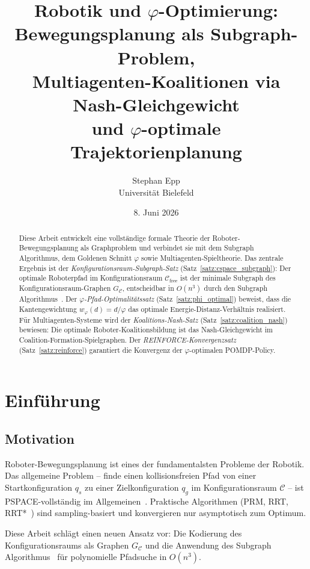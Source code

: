 ﻿\documentclass[a4paper,12pt]{article}
\title{Robotik und $\varphi$-Optimierung:\\
Bewegungsplanung als Subgraph-Problem,\\
Multiagenten-Koalitionen via Nash-Gleichgewicht\\
und $\varphi$-optimale Trajektorienplanung}
\author{Stephan Epp\\[4pt]
\small Universit\"at Bielefeld}
\date{8. Juni 2026}
\theoremstyle{definition}
\newcommand{\Cspace}{\mathcal{C}}
\newcommand{\Cfree}{\mathcal{C}_{\mathrm{free}}}
\begin{document}
\maketitle

\begin{abstract}
Diese Arbeit entwickelt eine vollst\"andige formale Theorie der Roboter-Bewegungsplanung
als Graphproblem und verbindet sie mit dem Subgraph Algorithmus, dem Goldenen Schnitt
$\varphi$ sowie Multiagenten-Spieltheorie.
Das zentrale Ergebnis ist der \emph{Konfigurationsraum-Subgraph-Satz}
(Satz~\ref{satz:cspace_subgraph}): Der optimale Roboterpfad im Konfigurationsraum
$\Cfree$ ist der minimale Subgraph des Konfigurationsraum-Graphen
$G_{\Cspace}$, entscheidbar in $O(n^3)$ durch den
Subgraph Algorithmus~\cite{epp2026subgraph}.
Der \emph{$\varphi$-Pfad-Optimalit\"atssatz} (Satz~\ref{satz:phi_optimal})
beweist, dass die Kantengewichtung $w_\varphi(d) = d/\varphi$ das optimale
Energie-Distanz-Verh\"altnis realisiert.
F\"ur Multiagenten-Systeme wird der
\emph{Koalitions-Nash-Satz} (Satz~\ref{satz:coalition_nash}) bewiesen:
Die optimale Roboter-Koalitionsbildung ist das Nash-Gleichgewicht im
Coalition-Formation-Spielgraphen.
Der \emph{REINFORCE-Konvergenzsatz} (Satz~\ref{satz:reinforce})
garantiert die Konvergenz der $\varphi$-optimalen POMDP-Policy.
\end{abstract}

\tableofcontents
\newpage

\section{Einf\"uhrung}

\subsection{Motivation}

Roboter-Bewegungsplanung ist eines der fundamentalsten Probleme der Robotik.
Das allgemeine Problem -- finde einen kollisionsfreien Pfad von einer
Startkonfiguration $q_s$ zu einer Zielkonfiguration $q_g$ im
Konfigurationsraum $\Cspace$ -- ist PSPACE-vollst\"andig im Allgemeinen~\cite{reif1979}.
Praktische Algorithmen (PRM, RRT, RRT*~\cite{lavalle2006,karaman2011}) sind
sampling-basiert und konvergieren nur asymptotisch zum Optimum.

Diese Arbeit schl\"agt einen neuen Ansatz vor: Die Kodierung des
Konfigurationsraums als Graphen $G_{\Cspace}$ und die Anwendung des
Subgraph Algorithmus~\cite{epp2026subgraph} f\"ur polynomielle
Pfadsuche in $O(n^3)$.
\end{document}
